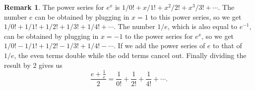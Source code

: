 \documentclass[11pt,oneside]{amsart}
\theoremstyle{definition}
\newtheorem{remark}{Remark}
\begin{document}
\begin{remark}
  The power series for $e^x$ is $1/0!+x/1!+x^2/2!+x^3/3!+\cdots$. The number $e$ can be obtained by plugging in $x=1$ to this power series, so we get $1/0!+1/1!+1/2!+1/3!+1/4!+\cdots$. The number $1/e$, which is also equal to $e^{-1}$, can be obtained by plugging in $x=-1$ to the power series for $e^x$, so we get $1/0!-1/1!+1/2!-1/3!+1/4!-\cdots$. If we add the power series of $e$ to that of $1/e$, the even terms double while the odd terms cancel out. Finally dividing the result by 2 gives us
  \[\frac{e+\frac 1e}2=\frac 1{0!}+\frac 1{2!}+\frac 1{4!}+\cdots.\]
\end{remark}
\end{document}
